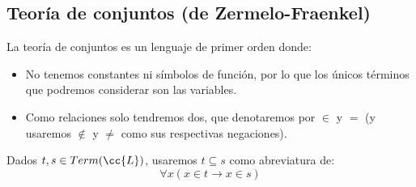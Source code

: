 \subsection{Teoría de conjuntos (de Zermelo-Fraenkel)}
La teoría de conjuntos es un lenguaje de primer orden donde:
\begin{itemize}
    \item No tenemos constantes ni símbolos de función, por lo que los únicos términos que podremos considerar son las variables.
    \item Como relaciones solo tendremos dos, que denotaremos por $\in $ y $=$ (y usaremos $\notin$ y $\neq$ como sus respectivas negaciones).
\end{itemize}

\begin{notacion}
    Dados $t,s\in Term(\cc{L})$, usaremos $t\subseteq s$ como abreviatura de:
    \begin{equation*}
        \forall x(x\in t\to x\in s)
    \end{equation*}
\end{notacion}

